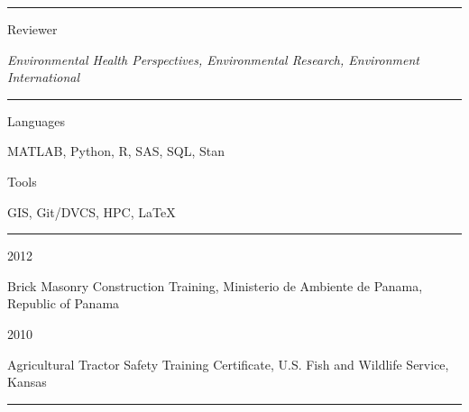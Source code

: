 \documentclass[a4paper,10pt]{article}
\newlength{\cvcolumngapwidth}
\newlength{\cvleftcolumnwidth}
\newlength{\cvrightcolumnwidth}
\newcommand{\cvsectionstyle}[1]{{\normalsize\cvsectionfont\textcolor{cvsectioncolor}{#1}}}
\newcommand{\cvdurationstyle}[1]{{\small\cvdurationfont\textcolor{cvdurationcolor}{#1}}}
\newlength{\cvafteritemskipamount}
\newlength{\cvaftersectionskipamount}
\newlength{\cvparskip}
\newcommand{\cvsection}[1]{
    \begin{minipage}[t]{\cvleftcolumnwidth}
        \raggedleft\cvsectionstyle{#1}
    \end{minipage}%
    \hspace{\cvcolumngapwidth}%
    \begin{minipage}[t]{\cvrightcolumnwidth}
        \textcolor{cvrulecolor}{\rule{\cvrightcolumnwidth}{0.3mm}}
    \end{minipage}

    \vspace{\cvaftersectionskipamount}
}
\newcommand{\cvitem}[2]{
    \begin{minipage}[t]{\cvleftcolumnwidth}
        \raggedleft #1
    \end{minipage}%
    \hspace{\cvcolumngapwidth}%
    \begin{minipage}[t]{\cvrightcolumnwidth}
        \setlength{\parskip}{\cvparskip} #2
    \end{minipage}

    \vspace{\cvafteritemskipamount}
}
\begin{document}

\cvsection{ACADEMIC SERVICE}

\cvitem{
    \cvdurationstyle{Reviewer}
}{
    \textit{Environmental Health Perspectives, Environmental Research, Environment International} 
}


\cvsection{PROGRAMMING SKILLS}

\cvitem{
    \cvdurationstyle{Languages}
}{
    MATLAB, Python, R, SAS, SQL, Stan
}
\cvitem{
    \cvdurationstyle{Tools}
}{
    GIS, Git/DVCS, HPC, \LaTeX
}


\cvsection{CERTIFICATIONS AND TRAININGS}

\cvitem{
    \cvdurationstyle{2012}
}{
    Brick Masonry Construction Training, Ministerio de Ambiente de Panama, Republic of Panama
}
\cvitem{
    \cvdurationstyle{2010}
}{
    Agricultural Tractor Safety Training Certificate, U.S. Fish and Wildlife Service, Kansas		     
}

\cvsection{PUBLICATIONS}
\end{document}
